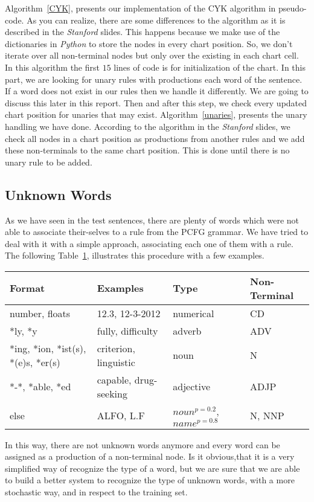 \documentclass[a4paper,11pt]{article}
\begin{document}
Algorithm~\ref{CYK}, presents our implementation of the CYK algorithm in pseudo-code. As you can realize, there are some differences to the algorithm as it is described in the \textit{Stanford} slides. This happens because we make use of the dictionaries in \textit{Python} to store the nodes in every chart position. So, we don't iterate over all non-terminal nodes but only over the existing in each chart cell. In this algorithm the first $15$ lines of code is for initialization of the chart. In this part, we are looking for unary rules with productions each word of the sentence. If a word does not exist in our rules then we handle it differently. We are going to discuss this later in this report. Then and after this step, we check every updated chart position for unaries that may exist. Algorithm~\ref{unaries}, presents the unary handling we have done. According to the algorithm in the \textit{Stanford} slides, we check all nodes in a chart position as productions from another rules and we add these non-terminals to the same chart position. This is done until there is no unary rule to be added.


\subsection{Unknown Words}
As we have seen in the test sentences, there are plenty of words which were not able to associate their-selves to a rule from the PCFG grammar. We have tried to deal with it with a simple approach, associating each one of them with a rule. The following Table~\ref{unknown}, illustrates this procedure with a few examples.
\begin{table}[h!]
\label{unknown}
\begin{center}
    \begin{tabular}{|l|l|l|l|}
\hline
        \textbf{Format} & \textbf{Examples} & \textbf{Type} & \textbf{Non-Terminal} \\
		\hline
        number, floats & 12.3, 12-3-2012 & numerical & CD \\ \hline
        *ly, *y & fully, difficulty & adverb & ADV \\ \hline
		*ing, *ion, *ist(s), *(e)s, *er(s) & criterion, linguistic & noun & N \\ \hline
        *-*, *able, *ed & capable, drug-seeking & adjective &  ADJP  \\ \hline
		else & ALFO, L.F & $noun^{p=0.2}$, $name^{p=0.8}$  & N, NNP \\ \hline
    \end{tabular}
\end{center}
\end{table}
In this way, there are not unknown words anymore and every word can be assigned as a production of a non-terminal node. Is it obvious,that it is a very simplified way of recognize the type of a word, but we are sure that we are able to build a better system to recognize the type of unknown words, with a more stochastic way, and in respect to the training set.
\end{document}
